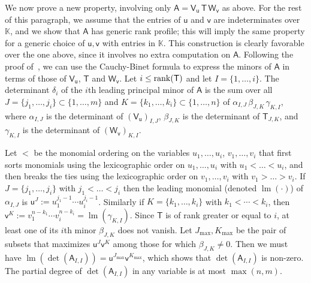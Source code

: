 \documentclass[sigconf]{acmart}
\newcommand{\vu}{\ensuremath{\mathsf{u}}}
\newcommand{\vv}{\ensuremath{\mathsf{v}}}
\newcommand{\mA}{\ensuremath{\mathsf{A}}}
\newcommand{\mT}{\ensuremath{\mathsf{T}}}
\newcommand{\mV}{\ensuremath{\mathsf{V}}}
\newcommand{\mW}{\ensuremath{\mathsf{W}}}
\newcommand{\K}{\ensuremath{\mathbb{K}}}
\newcommand{\lm}{\ensuremath{\operatorname{lm}}}
\newcommand{\todo}[1]{(\textbf{todo:} #1)}
\theoremstyle{acmdefinition}
\begin{document}

We now prove a new property, involving only
$\mA = \mV_\vu\, \mT\, \mW_\vv$ as above. For the rest of this
paragraph, we assume that the entries of $\vu$ and $\vv$ are
indeterminates over $\K$, and we show that $\mA$ has generic rank
profile; this will imply the same property for a generic choice of
$\vu,\vv$ with entries in $\K$. This construction is clearly favorable
over the one above, since it involves no extra computation on $\mA$.
Following the proof of~\cite[Theorem~5.6.2]{Pan01}, we can use the
Cauchy-Binet formula to express the minors of $\mA$ in terms of those
of $\mV_\vu$, $\mT$ and $\mW_\vv$. Let $i \le {\rm rank}(\mT)$ and let
$I=\{1,\dots,i\}$. The determinant $\delta_i$ of the $i$th leading
principal minor of $\mA$ is the sum over all
$J=\{j_1,\dots,j_i\} \subset \{1,\dots,m\}$ and
$K=\{k_1,\dots,k_i\} \subset \{1,\dots,n\}$ of
$\alpha_{I,J}\, \beta_{J,K}\, \gamma_{K,I}$, where $\alpha_{I,J}$ is
the determinant of $(\mV_\vu)_{I,J}$, $\beta_{J,K}$ is the determinant
of $\mT_{J,K}$, and $\gamma_{K,I}$ is the determinant of
$(\mW_\vv)_{K,I}$.

Let $<$ be the monomial ordering on the variables $u_1,\dots,u_i$,
$v_1,\dots,v_i$ that first sorts monomials using the lexicographic order on
$u_1,\dots,u_i$ with $u_1 < \dots < u_i$, and then breaks the ties using the
lexicographic order on $v_1,\dots,v_i$ with $v_1 > \dots > v_i$. If
$J=\{j_1,\dots,j_i\}$ with $j_1 < \dots < j_i$ then the leading monomial
(denoted $\lm(\cdot)$) of $\alpha_{I,J}$ is
$\vu^J := u_1^{j_1-1} \cdots u_i^{j_i-1}$.  Similarly if $K=\{k_1,\dots,k_i\}$
with $k_1 < \cdots < k_i$, then
$\vv^K := v_1^{n-k_1} \cdots v_i^{n-k_i}=\lm(\gamma_{K,I})$. Since $\mT$ is of
rank greater or equal to $i$, at least one of its $i$th minor $\beta_{J,K}$ does
not vanish. Let $J_{\max},K_{\max}$ be the pair of subsets that maximizes
$\vu^J \vv^K$ among those for which $\beta_{J,K} \neq 0$. Then we must have
$\lm(\det(\mA_{I,I})) = \vu^{J_{\max}} \vv^{K_{\max}}$, which shows that
$\det(\mA_{I,I})$ is non-zero. The partial degree of $\det(\mA_{I,I})$ in any variable
 is at most $\max(n,m)$. 
%
%

\vspace{-8px}
\end{document}
